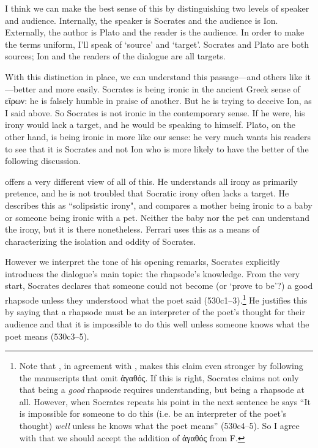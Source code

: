\documentclass[12pt,letterpaper]{article}
\begin{document}
I think we can make the best sense of this by distinguishing two levels of speaker and audience. Internally, the speaker is Socrates and the audience is Ion. Externally, the author is Plato and the reader is the audience. In order to make the terms uniform, I'll speak of `source' and `target'. Socrates and Plato are both sources; Ion and the readers of the dialogue are all targets.

With this distinction in place, we can understand this passage---and others like it---better and more easily. Socrates is being ironic in the ancient Greek sense of \textgreek{εἴρων}: he is falsely humble in praise of another. But he is trying to deceive Ion, as I said above. So Socrates is not ironic in the contemporary sense. If he were, his irony would lack a target, and he would be speaking to himself. Plato, on the other hand, is being ironic in more like our sense: he very much wants his readers to see that it is Socrates and not Ion who is more likely to have the better of the following discussion.

\textcite{ferrari2008} offers a very different view of all of this. He understands all irony as primarily pretence, and he is not troubled that Socratic irony often lacks a target. He describes this as ``solipsistic irony", and compares a mother being ironic to a baby or someone being ironic with a pet. Neither the baby nor the pet can understand the irony, but it is there nonetheless. Ferrari uses this as a means of characterizing the isolation and oddity of Socrates.

However we interpret the tone of his opening remarks, Socrates explicitly introduces the dialogue's main topic: the rhapsode's knowledge. From the very start, Socrates declares that someone could not become (or `prove to be'?) a good rhapsode unless they understood what the poet said (530c1--3).\footnote{Note that \textcite{canto2001}, in agreement with \textcite{meridier1931}, makes this claim even stronger by following the manuscripts that omit \textgreek{ἀγαθός}. If this is right, Socrates claims not only that being a \emph{good} rhapsode requires understanding, but being a rhapsode at all. However, when Socrates repeats his point in the next sentence he says ``It is impossible for someone to do this (i.e. be an interpreter of the poet's thought) \emph{well} unless he knows what the poet means'' (530c4--5). So I agree with \textcite{burnet1903} that we should accept the addition of \textgreek{ἀγαθός} from F.} He justifies this by saying that a rhapsode must be an interpreter of the poet's thought for their audience and that it is impossible to do this well unless someone knows what the poet means (530c3--5).
\end{document}
